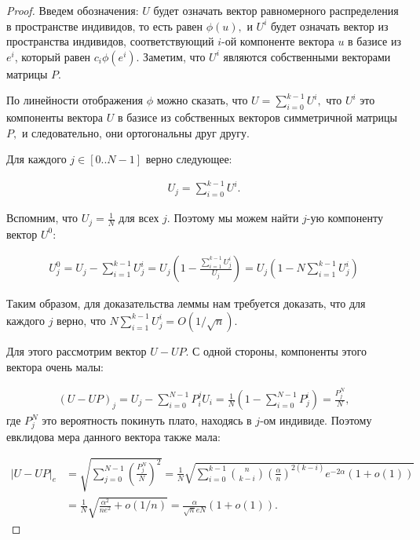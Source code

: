\documentclass[russian]{article}
\begin{document}
\begin{proof}

Введем обозначения: $U$ будет означать вектор равномерного распределения в пространстве индивидов, то есть равен $\phi(u),$ и $U^i$ будет означать вектор из пространства индивидов, соответствующий $i$-ой компоненте вектора $u$ в базисе из $e^i$, который равен $c_i\phi(e^i).$ Заметим, что $U^i$ являются собственными векторами матрицы $P.$

По линейности отображения $\phi$ можно сказать, что $U = \sum\limits_{i = 0}^{k - 1} U^i,$ что $U^i$ это компоненты вектора $U$ в базисе из собственных векторов симметричной матрицы $P,$ и следовательно, они ортогональны друг другу.

Для каждого $j \in [0..N-1]$ верно следующее:

\begin{align*}
  U_j = \sum\limits_{i = 0}^{k - 1} U^i.
\end{align*}

Вспомним, что $U_j = \frac{1}{N}$ для всех $j.$ Поэтому мы можем найти $j$-ую компоненту вектор $U^0:$

\begin{align*}
  U_j^0 = U_j - \sum\limits_{i = 1}^{k - 1} U_j^i = U_j \left(1 - \frac{\sum\limits_{i = 1}^{k - 1} U_j^i}{U_j}\right) = U_j \left(1 - N\sum\limits_{i = 1}^{k - 1} U_j^i\right)
\end{align*}

Таким образом, для доказательства леммы нам требуется доказать, что для каждого $j$ верно, что $N\sum\limits_{i = 1}^{k - 1} U_j^i = O(1/\sqrt{n}).$

Для этого рассмотрим вектор $U - UP.$ С одной стороны, компоненты этого вектора очень малы:

\begin{align*}
  (U - UP)_j = U_j - \sum\limits_{i = 0}^{N - 1} P_i^j U_i = \frac{1}{N} \left( 1 - \sum\limits_{i = 0}^{N - 1} P_j^i\right) = \frac{P_j^N}{N},
\end{align*}
где $P_j^N$ это вероятность покинуть плато, находясь в $j$-ом индивиде. Поэтому евклидова мера данного вектора также мала:

\begin{align*}
|U - UP|_e &= \sqrt{\sum\limits_{j = 0}^{N - 1} \left(\frac{P_j^N}{N}\right)^2} = \frac{1}{N} \sqrt{\sum\limits_{i = 0}^{k - 1} \binom{n}{k - i} \left(\frac{\alpha}{n}\right)^{2(k - i)} e^{-2\alpha} (1 + o(1))} \\
&= \frac{1}{N} \sqrt{\frac{\alpha^2}{ne^2} + o(1/n)} = \frac{\alpha}{\sqrt{n}eN} (1 + o(1)).
\end{align*}


\end{proof}
\end{document}

